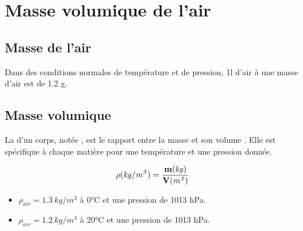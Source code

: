 \documentclass[12pt,a4paper]{article}
\begin{document}
\section{Masse volumique de l'air}

\subsection{Masse de l'air}

\begin{mybilan}
	Dans des conditions normales de température et de pression, 1l d'air à une masse d'air est de \num{1.2} g.
\end{mybilan}

\subsection{Masse volumique}

\begin{mybilan}
	La  d'un corps, notée \kw{$\rho$}, est le rapport entre la masse  et son volume . Elle est spécifique à chaque matière pour une température et une pression donnée.
	
	\begin{equation*}
		\mathbf{\rho} \mathit{{\small (kg/m^3)}} = \frac{\mathbf{m} \mathit{{\small (kg)}}}{\mathbf{V} \mathit{{\small (m^3)}}}
	\end{equation*}
\end{mybilan}

\begin{myex}
	\begin{itemize}
		\item $\rho_{air}  = \num{1.3} \: kg/m^3$ à 0°C et une pression de \num{1013} hPa.
		\item $\rho_{air}  = \num{1.2} \: kg/m^3$ à 20°C et une pression de \num{1013} hPa.
	\end{itemize}
\end{myex}
%
\end{document}
